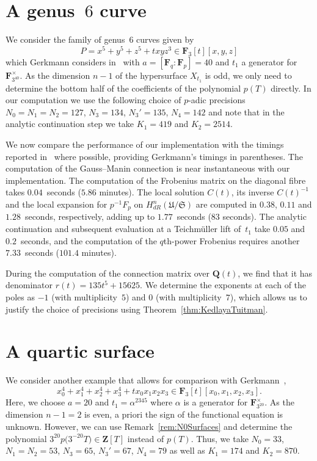\section{A genus~$6$ curve}

We consider the family of genus~$6$ curves given by 
\begin{equation}
P = x^5 + y^5 + z^5 + t x y z^3 \in \mathbf{F}_3[t][x,y,z]
\end{equation}
which Gerkmann considers in~\citep[\S 7.4]{Gerkmann2007} with 
$a = [\mathbf{F}_q : \mathbf{F}_p] = 40$ and $t_1$ a 
generator for $\mathbf{F}_{3^{40}}^{\times}$.  As the dimension 
$n - 1$ of the hypersurface $X_{t_1}$ is odd, we only need to 
determine the bottom half of the coefficients of the polynomial 
$p(T)$ directly.  In our computation we use the following choice of 
$p$-adic precisions $N_0 = N_1 = N_2 = 127$, $N_3 = 134$, $N_3' = 135$, 
$N_4 = 142$ and note that in the analytic continuation step we 
take $K_1 = 419$ and $K_2 = 2514$.

We now compare the performance of our implementation with the 
timings reported in~\citep[\S 7.4]{Gerkmann2007} where possible, 
providing Gerkmann's timings in parentheses.  The computation of the 
Gauss--Manin connection is near instantaneous with our implementation.  
The computation of the Frobenius matrix on the diagonal fibre takes 
$0.04$~seconds ($5.86$ minutes).  The local solution $C(t)$, its 
inverse $C(t)^{-1}$ and the local expansion for $p^{-1}F_p$ on 
$H_{dR}^n(\mathfrak{U}/\mathfrak{S})$ are computed in $0.38$, $0.11$ 
and $1.28$~seconds, respectively, adding up to $1.77$~seconds ($83$ seconds). 
The analytic continuation and subsequent evaluation at a Teichm\"uller lift 
of~$t_1$ take $0.05$ and $0.2$~seconds, and the computation of the $q$th-power 
Frobenius requires another $7.33$~seconds ($101.4$ minutes).

During the computation of the connection matrix over $\mathbf{Q}(t)$, 
we find that it has denominator $r(t) = 135 t^5 + 15625$.  We 
determine the exponents at each of the poles as $-1$ (with multiplicity~$5$) 
and $0$ (with multiplicity~$7$), which allows us to justify the choice 
of precisions using Theorem~\ref{thm:KedlayaTuitman}.

\section{A quartic surface}

We consider another example that allows for comparison with 
Gerkmann~\citep[\S 7.5]{Gerkmann2007},
\begin{equation}
x_0^4 + x_1^4 + x_2^4 + x_3^4 + t x_0 x_1 x_2 x_3 \in \mathbf{F}_3[t][x_0,x_1,x_2,x_3].
\end{equation}
Here, we choose $a = 20$ and $t_1 = \alpha^{2345}$ where 
$\alpha$ is a generator for $\mathbf{F}_{3^{20}}^{\times}$. 
As the dimension $n - 1 = 2$ is even, a priori the sign of the 
functional equation is unknown.  However, we can use 
Remark~\ref{rem:N0Surfaces} and determine the polynomial 
$3^{20} p\bigl(3^{-20} T\bigr) \in \mathbf{Z}[T]$ instead of $p(T)$. 
Thus, we take $N_0 = 33$, $N_1 = N_2 = 53$, $N_3 = 65$, 
$N_3' = 67$, $N_4 = 79$ as well as $K_1 = 174$ and $K_2 = 870$.


